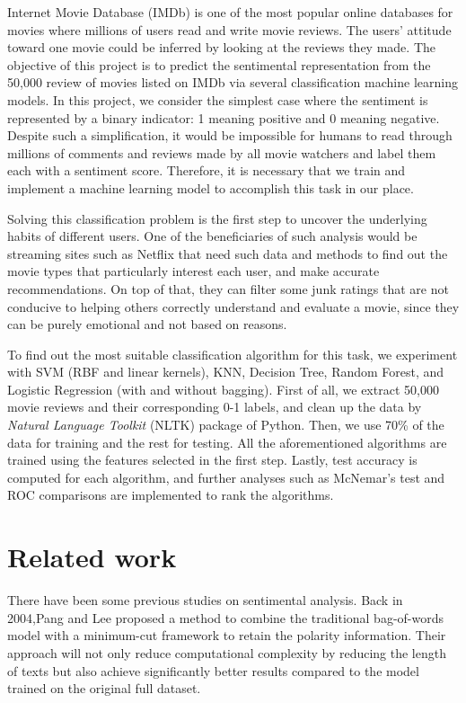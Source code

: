 \documentclass[10pt,twocolumn]{article}
\begin{document}
	Internet Movie Database (IMDb) is one of the most popular online databases for movies where millions of users read and write movie reviews. The users’ attitude toward one movie could be inferred by looking at the reviews they made. The objective of this project is to predict the sentimental
	representation from the 50,000 review of movies listed on IMDb\cite{maas-EtAl:2011:ACL-HLT2011} via several classification machine learning models. In this project, we consider the simplest case where the sentiment is represented by a binary indicator: 1 meaning positive and 0 meaning negative. Despite such a simplification, it would be impossible for humans to read through millions of comments and reviews made by all movie watchers and label them each with a sentiment score. Therefore, it is necessary that we train and implement a machine learning model to accomplish this task in our place. 
	
	Solving this classification problem is the first step to uncover the underlying habits of different users. One of the beneficiaries of such analysis would be streaming sites such as Netflix that need such data and methods to find out the movie types that particularly interest each user, and make accurate recommendations. On top of that, they can filter some junk ratings that are not conducive to helping others correctly understand and evaluate a movie, since they can be purely emotional and not based on reasons. 
	
	To find out the most suitable classification algorithm for this task, we experiment with SVM (RBF and linear kernels), KNN, Decision Tree, Random Forest, and Logistic Regression (with and without bagging). First of all, we extract 50,000 movie reviews and their corresponding 0-1 labels, and clean up the data by \textit{Natural Language Toolkit} (NLTK) package of Python. Then, we use 70\% of the data for training and the rest for testing. All the aforementioned algorithms are trained using the features selected in the first step. Lastly, test accuracy is computed for each algorithm, and further analyses such as McNemar's test and ROC comparisons are implemented to rank the algorithms.

	\section{Related work}
	There have been some previous studies on sentimental analysis. Back in 2004,Pang and Lee proposed a method to combine the traditional bag-of-words model with a minimum-cut framework to retain the polarity information\cite{DBLP:journals/corr/cs-CL-0409058}. Their approach will not only reduce computational complexity by reducing the length of texts but also achieve significantly better results compared to the model trained on the original full dataset. 
\end{document}
